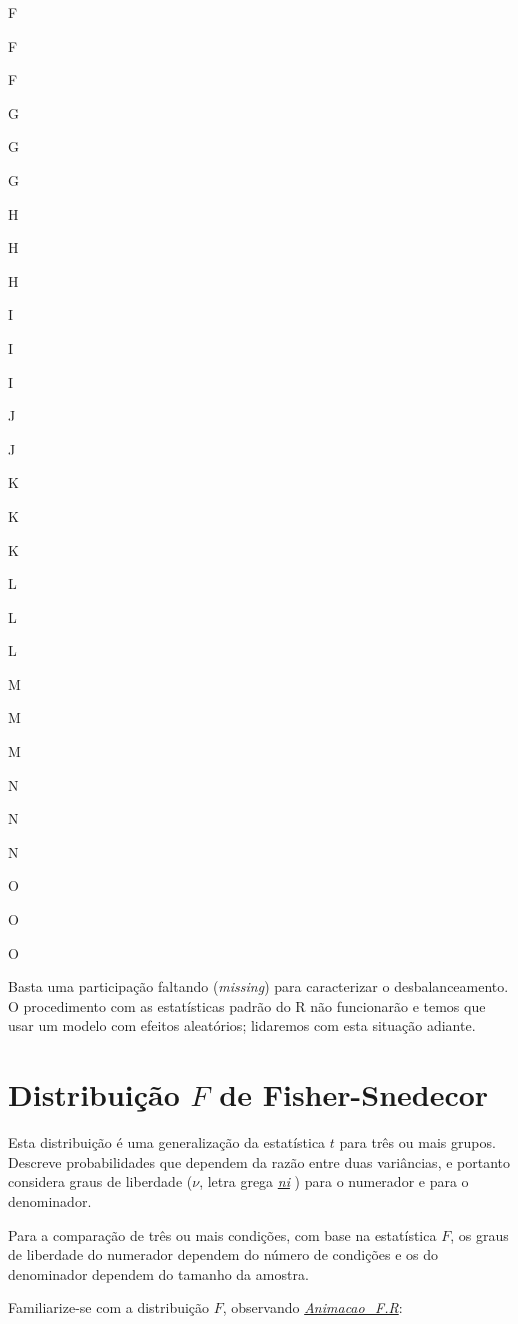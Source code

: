 \documentclass[]{article}
\begin{document}
F

F

F

G

G

G

H

H

H

I

I

I

J

J

K

K

K

L

L

L

M

M

M

N

N

N

O

O

O

Basta uma participação faltando (\emph{missing}) para caracterizar o
desbalanceamento. O procedimento com as estatísticas padrão do R não
funcionarão e temos que usar um modelo com efeitos aleatórios; lidaremos
com esta situação adiante.

\section{\texorpdfstring{Distribuição \(F\) de
Fisher-Snedecor}{Distribuição F de Fisher-Snedecor}}\label{distribuicao-f-de-fisher-snedecor}

Esta distribuição é uma generalização da estatística \(t\) para três ou
mais grupos. Descreve probabilidades que dependem da razão entre duas
variâncias, e portanto considera graus de liberdade (\(\nu\), letra
grega \emph{\href{https://pt.wikipedia.org/wiki/\%CE\%9D}{ni}} ) para o
numerador e para o denominador.

Para a comparação de três ou mais condições, com base na estatística
\(F\), os graus de liberdade do numerador dependem do número de
condições e os do denominador dependem do tamanho da amostra.

Familiarize-se com a distribuição \(F\), observando
\emph{\url{Animacao_F.R}}:
\end{document}
